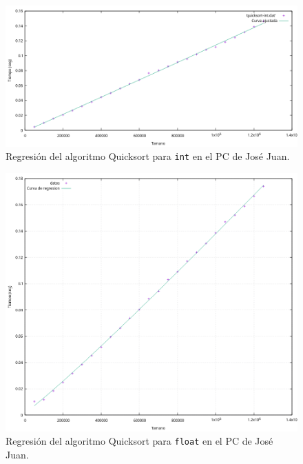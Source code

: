 \documentclass[12pt]{article}
\begin{document}
    \begin{figure}
        \centering
        \includegraphics[width=\linewidth]{images/quicksort/graficas/quicksort-int-regresion.png}
        \cprotect\caption{Regresión del algoritmo Quicksort para \verb|int| en el PC de José Juan.}
        \label{fig:RegresionQuicksortInt}
    \end{figure}
    \begin{figure}
        \centering
        \includegraphics[width=0.8\linewidth]{images/quicksort/graficas/quicksort-float-regresion.png}
        \cprotect\caption{Regresión del algoritmo Quicksort para \verb|float| en el PC de José Juan.}
        \label{fig:RegresionQuicksortFloat}
    \end{figure}
\end{document}
